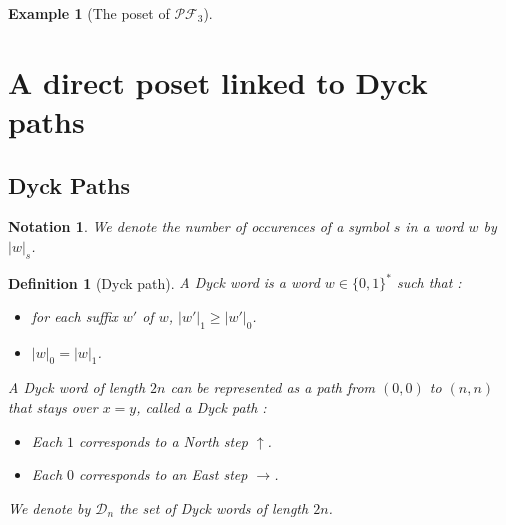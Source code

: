 \documentclass[12pt]{report}
\newtheorem{definition}{Definition}
\newtheorem*{example}{Example}
\newtheorem*{notation}{Notation}
\begin{document}
\begin{example}[The poset of $\mathcal{PF}_3$]
\begin{center}
    \end{center}
\end{example}

\section{A direct poset linked to Dyck paths}

\subsection{Dyck Paths}

\begin{notation}
    We denote the number of occurences of a symbol $s$ in
    a word $w$ by $|w|_s$.
\end{notation}

\begin{definition}[Dyck path]
    A \emph{Dyck word} is a word $w \in \{0,1\}^*$ such
    that :
    \begin{itemize}
        \item for each \emph{suffix} $w'$ of $w$,
            $|w'|_1 \geqslant |w'|_0$.
        \item $|w|_0 = |w|_1$.
    \end{itemize}
    A Dyck word of length $2n$ can be represented as a 
    \emph{path} from $(0,0)$ to $(n,n)$ that stays over
    $x = y$, called a \emph{Dyck path} :
    \begin{itemize}
        \item Each $1$ corresponds to a \emph{North step}
        $\uparrow$. 
        \item Each $0$ corresponds to an \emph{East step}
        $\rightarrow$.
    \end{itemize}
    We denote by $\mathcal{D}_n$ the set of Dyck words of
    length $2n$.
\end{definition}
\end{document}
